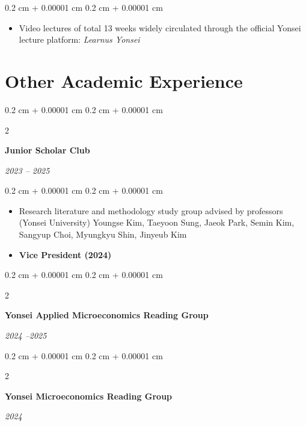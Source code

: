 \documentclass[10pt, letterpaper]{article}
\newenvironment{highlights}{
	\begin{itemize}[
		topsep=0.10 cm,
		parsep=0.10 cm,
		partopsep=0pt,
		itemsep=0pt,
		leftmargin=0.4 cm + 10pt
		]
	}{
	\end{itemize}
} %
\newenvironment{onecolentry}{
	\begin{adjustwidth}{
			0.2 cm + 0.00001 cm
		}{
			0.2 cm + 0.00001 cm
		}
	}{
	\end{adjustwidth}
} %
\newenvironment{twocolentry}[2][]{
	\onecolentry
	\def\secondColumn{#2}
	\setcolumnwidth{\fill, 4.5 cm}
	\begin{paracol}{2}
	}{
		\switchcolumn \raggedleft \secondColumn
	\end{paracol}
	\endonecolentry
} %
\begin{document}
	\vspace{0.10 cm}
	\begin{onecolentry}
		\begin{highlights}
			\item Video lectures of total 13 weeks widely circulated through the official Yonsei lecture platform: \textit{Learnus Yonsei}
		\end{highlights}
	\end{onecolentry}
	
	\vspace{12pt}
	
\section{Other Academic Experience}
	
	\begin{twocolentry}{
			
			
			\textit{2023 – 2025}}
		\textbf{Junior Scholar Club}
	\end{twocolentry}
	
	\vspace{0.10 cm}
	\begin{onecolentry}
	\begin{highlights}
		\item Research literature and methodology study group advised by professors (Yonsei University) Youngse Kim, Taeyoon Sung, Jaeok Park, Semin Kim, Sangyup Choi, Myungkyu Shin, Jinyeub Kim
		\item \textbf{Vice President (2024)}
	\end{highlights}
\end{onecolentry}
	
	
	\vspace{0.2 cm}
	
	\begin{twocolentry}{
			
			
			\textit{2024 –2025}}
		\textbf{Yonsei Applied Microeconomics Reading Group}
	\end{twocolentry}

	
		\vspace{0.2 cm}
	
	
	\begin{twocolentry}{
			
			
			\textit{2024 }}
		\textbf{Yonsei Microeconomics Reading Group}
	\end{twocolentry}
	
	\vspace{0.2 cm}
	
\end{document}
